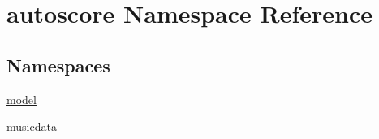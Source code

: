 \hypertarget{namespaceautoscore}{}\section{autoscore Namespace Reference}
\label{namespaceautoscore}
\subsection*{Namespaces}
\begin{DoxyCompactItemize}
\item 
 \hyperlink{namespaceautoscore_1_1model}{model}
\item 
 \hyperlink{namespaceautoscore_1_1musicdata}{musicdata}
\end{DoxyCompactItemize}
